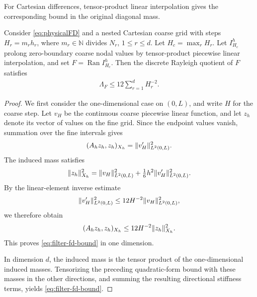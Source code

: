 \documentclass[print,wide,eng]{draft}
\begin{document}
For Cartesian differences, tensor-product linear interpolation gives the corresponding bound in the original diagonal mass.
%
\begin{proposition}\label{prop:filter-fd}
Consider \cref{eq:physicalFD} and a nested Cartesian coarse grid with steps $H_r=m_rh_r$, where $m_r\in\mathbb N$ divides $N_r$, $1\le r\le d$. Let $H_c=\max_rH_r$. Let $I_{H_c}^h$ prolong zero-boundary coarse nodal values by tensor-product piecewise linear interpolation, and set $F=\operatorname{Ran}I_{H_c}^h$. Then the discrete Rayleigh quotient of $F$ satisfies\vspace{-2mm}
%
\begin{align}\label{eq:filter-fd-bound}
\Lambda_F\le12\sum_{r=1}^dH_r^{-2}.
\end{align}
%
\end{proposition}
%
\begin{proof}
We first consider the one-dimensional case on $(0,L)$, and write $H$ for the coarse step. Let $v_H$ be the continuous coarse piecewise linear function, and let $z_h$ denote its vector of values on the fine grid. Since the endpoint values vanish, summation over the fine intervals gives\vspace{-2mm}
%
$$
(A_hz_h,z_h)_{X_h}=\|v_H'\|_{L^2(0,L)}^2.\vspace{-2mm}
$$
%
The induced mass satisfies\vspace{-2mm}
%
$$
\|z_h\|_{X_h}^2=\|v_H\|_{L^2(0,L)}^2+\tfrac16h^2\|v_H'\|_{L^2(0,L)}^2.\vspace{-2mm}
$$
%
By the linear-element inverse estimate\vspace{-2mm}
$$
\|v_H'\|_{L^2(0,L)}^2\le12H^{-2}\|v_H\|_{L^2(0,L)}^2,\vspace{-2mm}
$$
we therefore obtain\vspace{-2mm}
$$
(A_hz_h,z_h)_{X_h}\le12H^{-2}\|z_h\|_{X_h}^2.\vspace{-2mm}
$$
This proves \cref{eq:filter-fd-bound} in one dimension.

In dimension $d$, the induced mass is the tensor product of the one-dimensional induced masses. Tensorizing the preceding quadratic-form bound with these masses in the other directions, and summing the resulting directional stiffness terms, yields \cref{eq:filter-fd-bound}.
\end{proof}
%
\end{document}
